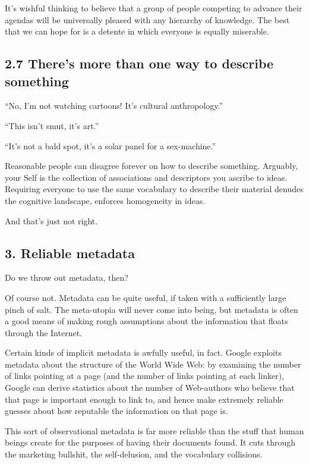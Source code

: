 It's wishful thinking to believe that a group of people competing
to advance their agendas will be universally pleased with any
hierarchy of knowledge. The best that we can hope for is a detente
in which everyone is equally miserable.

\subsection{2.7 There's more than one way to describe something}

``No, I'm not watching cartoons! It's cultural anthropology.''

``This isn't smut, it's art.''

``It's not a bald spot, it's a solar panel for a sex-machine.''

Reasonable people can disagree forever on how to describe
something. Arguably, your Self is the collection of associations
and descriptors you ascribe to ideas. Requiring everyone to use the
same vocabulary to describe their material denudes the cognitive
landscape, enforces homogeneity in ideas.

And that's just not right.

\subsection{3. Reliable metadata}

Do we throw out metadata, then?

Of course not. Metadata can be quite useful, if taken with a
sufficiently large pinch of salt. The meta-utopia will never come
into being, but metadata is often a good means of making rough
assumptions about the information that floats through the
Internet.

Certain kinds of implicit metadata is awfully useful, in fact.
Google exploits metadata about the structure of the World Wide Web:
by examining the number of links pointing at a page (and the number
of links pointing at each linker), Google can derive statistics
about the number of Web-authors who believe that that page is
important enough to link to, and hence make extremely reliable
guesses about how reputable the information on that page is.

This sort of observational metadata is far more reliable than the
stuff that human beings create for the purposes of having their
documents found. It cuts through the marketing bullshit, the
self-delusion, and the vocabulary collisions.

